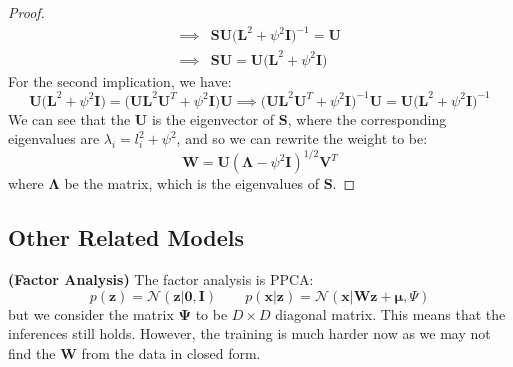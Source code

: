 \begin{proof}
\begin{equation*}
\begin{aligned}
        \implies & \boldsymbol S\boldsymbol U \Big( \boldsymbol L^2 + \psi^2\boldsymbol I \Big)^{-1}=\boldsymbol U \\
        \implies & \boldsymbol S\boldsymbol U =\boldsymbol U \Big( \boldsymbol L^2 + \psi^2\boldsymbol I \Big)
    \end{aligned}
    \end{equation*}
    For the second implication, we have:
    \begin{equation*}
        \boldsymbol U\Big(\boldsymbol L^2 + \psi^2\boldsymbol I\Big) = \Big(\boldsymbol U\boldsymbol L^2\boldsymbol U^T+ \psi^2\boldsymbol I\Big)\boldsymbol U \implies \Big( \boldsymbol U\boldsymbol L^2\boldsymbol U^T + \psi^2\boldsymbol I \Big)^{-1}\boldsymbol U = \boldsymbol U\Big(\boldsymbol L^2 + \psi^2\boldsymbol I\Big)^{-1}
    \end{equation*}
    We can see that the $\boldsymbol U$ is the eigenvector of $\boldsymbol S$, where the corresponding eigenvalues are $\lambda_i = l_i^2 + \psi^2$, and so we can rewrite the weight to be:
    \begin{equation*}
        \boldsymbol W = \boldsymbol U (\boldsymbol \Lambda - \psi^2\boldsymbol I)^{1/2}\boldsymbol V^T
    \end{equation*}
    where $\boldsymbol \Lambda$ be the matrix, which is the eigenvalues of $\boldsymbol S$.
\end{proof}

\subsection{Other Related Models}

\begin{definition}{\textbf{(Factor Analysis)}}
    The factor analysis is PPCA:
    \begin{equation*}
        p(\boldsymbol z) = \mathcal{N}(\boldsymbol z | \boldsymbol 0,\boldsymbol  I) \qquad p(\boldsymbol x|\boldsymbol z) = \mathcal{N}(\boldsymbol x | \boldsymbol W\boldsymbol z + \boldsymbol \mu, \Psi)
    \end{equation*}
    but we consider the matrix $\boldsymbol \Psi$ to be $D\times D$ diagonal matrix. This means that the inferences still holds. However, the training is much harder now as we may not find the $\boldsymbol W$ from the data in closed form. 
\end{definition}


